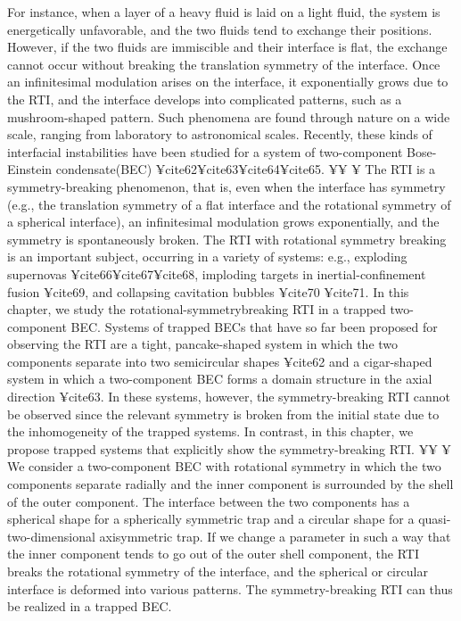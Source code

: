{{{{{For instance, when a layer of a heavy fluid is laid on a light fluid,
the system is energetically unfavorable, and the two fluids tend to exchange their positions.
However, if the two fluids are immiscible and their interface is flat,
the exchange cannot occur without breaking the translation symmetry of the interface.
Once an infinitesimal modulation arises on the interface,
it exponentially grows due to the RTI,
and the interface develops into complicated patterns,
such as a mushroom-shaped pattern.
Such phenomena are found through nature on a wide scale,
ranging from laboratory to astronomical scales.
Recently, these kinds of interfacial instabilities have been
studied for a system of two-component Bose-Einstein condensate(BEC) ¥cite{62}¥cite{63}¥cite{64}¥cite{65}.
¥¥
¥ The RTI is a symmetry-breaking phenomenon, that is,
even when the interface has symmetry
(e.g., the translation symmetry of a flat interface and the rotational symmetry
of a spherical interface), an infinitesimal modulation grows
exponentially, and the symmetry is spontaneously broken.
The RTI with rotational symmetry breaking is an important subject,
occurring in a variety of systems:
e.g., exploding supernovas ¥cite{66}¥cite{67}¥cite{68}, 
imploding targets in inertial-confinement fusion ¥cite{69},
and collapsing cavitation bubbles ¥cite{70} ¥cite{71}.
In this chapter, we study the rotational-symmetrybreaking RTI
in a trapped two-component BEC.
Systems of trapped BECs that have so far been proposed for observing the RTI
are a tight,
pancake-shaped system in which the two components separate into two semicircular shapes ¥cite{62}
and a cigar-shaped system in which a two-component BEC forms a domain
structure in the axial direction ¥cite{63}.
In these systems, however, the symmetry-breaking RTI cannot be observed since 
the relevant symmetry is broken from the initial state due to the inhomogeneity of the trapped systems.
In contrast, in this chapter, we propose trapped systems that explicitly show the symmetry-breaking RTI.
¥¥
¥ We consider a two-component BEC with rotational symmetry in which the two components separate radially and
the inner component is surrounded by the shell of the outer component.
The interface between the two components has a spherical shape for a spherically symmetric trap
and a circular shape for a quasi-two-dimensional axisymmetric trap.
If we change a parameter in such a way that the inner component tends to go out of
the outer shell component,
the RTI breaks the rotational symmetry of the interface, and the spherical or
circular interface is deformed into various patterns.
The symmetry-breaking RTI can thus be realized in a trapped BEC.

}}}}}
